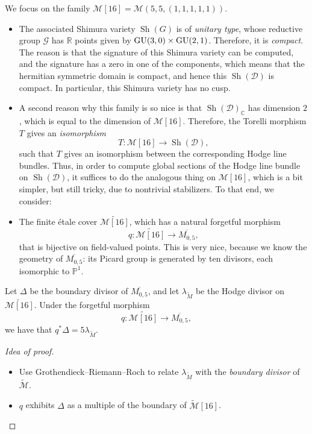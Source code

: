 \documentclass[reqno]{amsart} 
\begin{document}
We focus on the family $\mathcal{M}[16] = \mathcal{M}(5, 5,(1, 1, 1, 1, 1))$.
\begin{itemize}
\item The associated Shimura variety $\operatorname{Sh}(G)$ is of \emph{unitary type}, whose reductive group $\mathcal{G}$ has $\mathbb{R}$ points given by $\operatorname{GU}(3, 0) \times \operatorname{GU}(2, 1)$.   Therefore, it is \emph{compact}.  The reason is that the signature of this Shimura variety can be computed, and the signature has a zero in one of the components, which means that the hermitian symmetric domain is compact, and hence this $\operatorname{Sh}(\mathcal{D})$ is compact.  In particular, this Shimura variety has no cusp.
\item A second reason why this family is so nice is that $\operatorname{Sh}(\mathcal{D})_{\mathbb{C}}$ has dimension $2$, which is equal to the dimension of $\mathcal{M}[16]$.  Therefore, the Torelli morphism $T$ gives an \emph{isomorphism}
  \begin{equation*}
    T : \mathcal{M}[16] \rightarrow \operatorname{Sh}(\mathcal{D}),
  \end{equation*}
  such that $T$ gives an isomorphism between the corresponding Hodge line bundles.  Thus, in order to compute global sections of the Hodge line bundle on $\operatorname{Sh}(\mathcal{D})$, it suffices to do the analogous thing on $\mathcal{M}[16]$, which is a bit simpler, but still tricky, due to nontrivial stabilizers.  To that end, we consider:
\item The finite {\'e}tale cover $\tilde{\mathcal{M}[16]}$, which has a natural forgetful morphism
  \begin{equation*}
    q : \tilde{\mathcal{M}[16]} \rightarrow \overline{M_{0, 5}},
  \end{equation*}
  that is bijective on field-valued points.  This is very nice, because we know the geometry of $\overline{M_{0, 5}}$: its Picard group is generated by ten divisors, each isomorphic to $\mathbb{P}^1$.
\end{itemize}

\begin{proposition}
  Let $\Delta$ be the boundary divisor of $\overline{M_{0, 5}}$, and let $\lambda_{\tilde{M}}$ be the Hodge divisor on $\tilde{\mathcal{M}[16]}$.  Under the forgetful morphism
  \begin{equation*}
    q : \tilde{\mathcal{M}[16]} \rightarrow \overline{M_{0, 5}},
  \end{equation*}
  we have that $q^\ast \Delta = 5 \lambda_{\tilde{M}}$.
\end{proposition}
\begin{proof}[Idea of proof]
  \begin{itemize}
  \item Use Grothendieck--Riemann--Roch to relate $\lambda_{\tilde{M}}$ with the \emph{boundary divisor} of $\tilde{\mathcal{M}}$.
  \item $q$ exhibits $\Delta$ as a multiple of the boundary of $\tilde{\mathcal{M}}[16]$.
  \end{itemize}
\end{proof}
\end{document}
